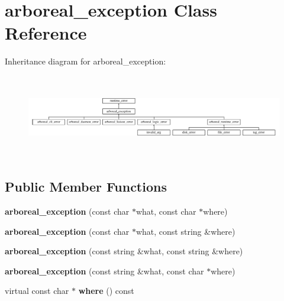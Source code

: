 \hypertarget{classarboreal__exception}{}\section{arboreal\+\_\+exception Class Reference}
\label{classarboreal__exception}
Inheritance diagram for arboreal\+\_\+exception\+:\begin{figure}[H]
\begin{center}
\leavevmode
\includegraphics[height=3.684211cm]{classarboreal__exception}
\end{center}
\end{figure}
\subsection*{Public Member Functions}
\begin{DoxyCompactItemize}
\item 
\mbox{\label{classarboreal__exception_a45ed8be47f52411504834440c481bc5f}} 
{\bfseries arboreal\+\_\+exception} (const char $\ast$what, const char $\ast$where)
\item 
\mbox{\label{classarboreal__exception_a7d89267e972d47ac4052e3d6c94ee73b}} 
{\bfseries arboreal\+\_\+exception} (const char $\ast$what, const string \&where)
\item 
\mbox{\label{classarboreal__exception_a3a3f2a7034c07dc5fe694ff860c0d4b4}} 
{\bfseries arboreal\+\_\+exception} (const string \&what, const string \&where)
\item 
\mbox{\label{classarboreal__exception_ac3099afc0a14eed3408dfffaac47d4ca}} 
{\bfseries arboreal\+\_\+exception} (const string \&what, const char $\ast$where)
\item 
\mbox{\label{classarboreal__exception_a802003dee586aaeb0b0d7ce909da2dad}} 
virtual const char $\ast$ {\bfseries where} () const
\end{DoxyCompactItemize}
